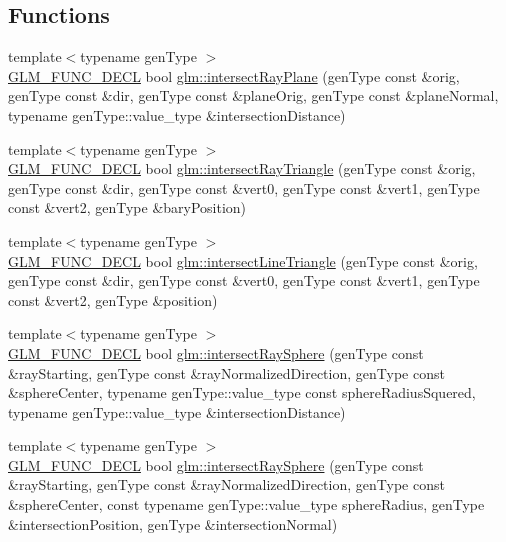 \subsection*{Functions}
\begin{DoxyCompactItemize}
\item 
{\footnotesize template$<$typename gen\+Type $>$ }\\\hyperlink{setup_8hpp_ab2d052de21a70539923e9bcbf6e83a51}{G\+L\+M\+\_\+\+F\+U\+N\+C\+\_\+\+D\+E\+CL} bool \hyperlink{group__gtx__intersect_gad3697a9700ea379739a667ea02573488}{glm\+::intersect\+Ray\+Plane} (gen\+Type const \&orig, gen\+Type const \&dir, gen\+Type const \&plane\+Orig, gen\+Type const \&plane\+Normal, typename gen\+Type\+::value\+\_\+type \&intersection\+Distance)
\item 
{\footnotesize template$<$typename gen\+Type $>$ }\\\hyperlink{setup_8hpp_ab2d052de21a70539923e9bcbf6e83a51}{G\+L\+M\+\_\+\+F\+U\+N\+C\+\_\+\+D\+E\+CL} bool \hyperlink{group__gtx__intersect_gab16c1b47c10451e7604b51b39a7ef21d}{glm\+::intersect\+Ray\+Triangle} (gen\+Type const \&orig, gen\+Type const \&dir, gen\+Type const \&vert0, gen\+Type const \&vert1, gen\+Type const \&vert2, gen\+Type \&bary\+Position)
\item 
{\footnotesize template$<$typename gen\+Type $>$ }\\\hyperlink{setup_8hpp_ab2d052de21a70539923e9bcbf6e83a51}{G\+L\+M\+\_\+\+F\+U\+N\+C\+\_\+\+D\+E\+CL} bool \hyperlink{group__gtx__intersect_ga9d29b9b3acb504d43986502f42740df4}{glm\+::intersect\+Line\+Triangle} (gen\+Type const \&orig, gen\+Type const \&dir, gen\+Type const \&vert0, gen\+Type const \&vert1, gen\+Type const \&vert2, gen\+Type \&position)
\item 
{\footnotesize template$<$typename gen\+Type $>$ }\\\hyperlink{setup_8hpp_ab2d052de21a70539923e9bcbf6e83a51}{G\+L\+M\+\_\+\+F\+U\+N\+C\+\_\+\+D\+E\+CL} bool \hyperlink{group__gtx__intersect_gac88f8cd84c4bcb5b947d56acbbcfa56e}{glm\+::intersect\+Ray\+Sphere} (gen\+Type const \&ray\+Starting, gen\+Type const \&ray\+Normalized\+Direction, gen\+Type const \&sphere\+Center, typename gen\+Type\+::value\+\_\+type const sphere\+Radius\+Squered, typename gen\+Type\+::value\+\_\+type \&intersection\+Distance)
\item 
{\footnotesize template$<$typename gen\+Type $>$ }\\\hyperlink{setup_8hpp_ab2d052de21a70539923e9bcbf6e83a51}{G\+L\+M\+\_\+\+F\+U\+N\+C\+\_\+\+D\+E\+CL} bool \hyperlink{group__gtx__intersect_gad28c00515b823b579c608aafa1100c1d}{glm\+::intersect\+Ray\+Sphere} (gen\+Type const \&ray\+Starting, gen\+Type const \&ray\+Normalized\+Direction, gen\+Type const \&sphere\+Center, const typename gen\+Type\+::value\+\_\+type sphere\+Radius, gen\+Type \&intersection\+Position, gen\+Type \&intersection\+Normal)

\end{DoxyCompactItemize}
